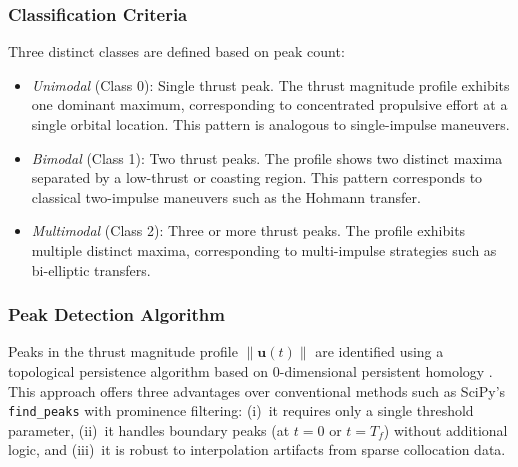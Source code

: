 \documentclass[a4paper,fleqn]{cas-dc}
\begin{document}
\subsubsection{Classification Criteria}

Three distinct classes are defined based on peak count:

\begin{itemize}
\item \textit{Unimodal} (Class 0): Single thrust peak. The thrust magnitude profile exhibits one dominant maximum, corresponding to concentrated propulsive effort at a single orbital location. This pattern is analogous to single-impulse maneuvers.

\item \textit{Bimodal} (Class 1): Two thrust peaks. The profile shows two distinct maxima separated by a low-thrust or coasting region. This pattern corresponds to classical two-impulse maneuvers such as the Hohmann transfer.

\item \textit{Multimodal} (Class 2): Three or more thrust peaks. The profile exhibits multiple distinct maxima, corresponding to multi-impulse strategies such as bi-elliptic transfers.
\end{itemize}

\subsubsection{Peak Detection Algorithm}

Peaks in the thrust magnitude profile $\|\mathbf{u}(t)\|$ are identified using a topological persistence algorithm based on 0-dimensional persistent homology \citep{Edelsbrunner2010,Huber2021}. This approach offers three advantages over conventional methods such as SciPy's \texttt{find\_peaks} with prominence filtering: (i)~it requires only a single threshold parameter, (ii)~it handles boundary peaks (at $t = 0$ or $t = T_f$) without additional logic, and (iii)~it is robust to interpolation artifacts from sparse collocation data.
\end{document}
